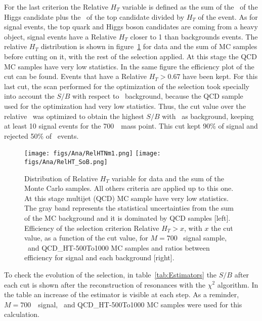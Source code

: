 For the last criterion the Relative $H_{T}$ variable is defined as the sum of the \pt~of the Higgs candidate plus the \pt~of the top candidate divided by $H_{T}$ of the event. As for signal events, the top quark and Higgs boson candidates are coming from a heavy object, signal events have a Relative $H_{T}$ closer to 1 than backgrounds events. The relative $H_{T}$ distribution is shown in figure~\ref{fig:RelHtMass} for data and the sum of MC samples before cutting on it, with the rest of the selection applied. At this stage the QCD MC samples have very low statistics. In the same figure the efficiency plot of the cut can be found. Events that have a Relative $H_{T}>0.67$ have been kept. For this last cut, the scan performed for the optimization of the selection took specially into account the $S/B$ with respect to \ttbar~background, because the QCD sample used for the optimization had very low statistics. Thus, the cut value over the relative \HT~was optimized to obtain the highest $S/B$ with \ttbar~as background, keeping at least 10 signal events for the 700~\GeVcc~mass point. This cut kept 90\% of signal and rejected 50\% of \ttbar~events.

\begin{figure}[!Hhtbp]
  \begin{center}
    \texttt{[image: figs/Ana/RelHTNm1.png]}
    \texttt{[image: figs/Ana/RelHT\_SoB.png]}
    \caption{Distribution of Relative $H_{T}$ variable for data and the sum of the Monte Carlo samples. All others criteria are applied up to this one. At this stage multijet (QCD) MC sample have very low statistics. The gray band represents the statistical uncertainties from the sum of the MC background and it is dominated by QCD samples [left]. Efficiency of the selection criterion Relative $H_{T}>x$, with $x$ the cut value, as a function of the cut value, for $M=700$ \GeVcc~signal sample, \ttbar~and QCD\_HT-500To1000 MC samples and ratios between efficiency for signal and each background [right]. }
    \label{fig:RelHtMass}
  \end{center}
\end{figure}

To check the evolution of the selection, in table~\ref{tab:Estimators} the $S/B$ after each cut is shown after the reconstruction of resonances with the $\chi^{2}$ algorithm. In the table an increase of the estimator is visible at each step. As a reminder, ${M=700}$~\GeVcc~signal, \ttbar~and QCD\_HT-500To1000 MC samples were used for this calculation. %

